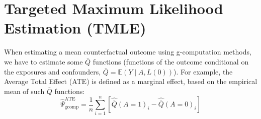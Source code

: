 \documentclass[
]{book}
\newenvironment{Shaded}{\begin{snugshade}}{\end{snugshade}}
\newcommand{\CommentTok}[1]{\textcolor[rgb]{0.56,0.35,0.01}{\textit{#1}}}
\newcommand{\DecValTok}[1]{\textcolor[rgb]{0.00,0.00,0.81}{#1}}
\newcommand{\FunctionTok}[1]{\textcolor[rgb]{0.00,0.00,0.00}{#1}}
\newcommand{\NormalTok}[1]{#1}
\newcommand{\OtherTok}[1]{\textcolor[rgb]{0.56,0.35,0.01}{#1}}
\newcommand{\SpecialCharTok}[1]{\textcolor[rgb]{0.00,0.00,0.00}{#1}}
\begin{document}
\begin{Shaded}
\end{Shaded}

\hypertarget{chap_tmle}{%
\chapter{Targeted Maximum Likelihood Estimation (TMLE)}\label{chap_tmle}}

When estimating a mean counterfactual outcome using g-computation methods, we have to estimate some \(\bar{Q}\) functions (functions of the outcome conditional on the exposures and confounders, \(\bar{Q}=\mathbb{E}\left(Y\mid A,L(0)\right)\)). For example, the Average Total Effect (ATE) is defined as a marginal effect, based on the empirical mean of such \(\bar{Q}\) functions:
\begin{equation*}
\hat{\Psi}^{\text{ATE}}_{\text{gcomp}} = \frac{1}{n} \sum_{i=1}^n \left[ \hat{\overline{Q}}(A=1)_i - \hat{\overline{Q}}(A=0)_i \right]
\end{equation*}
\end{document}

